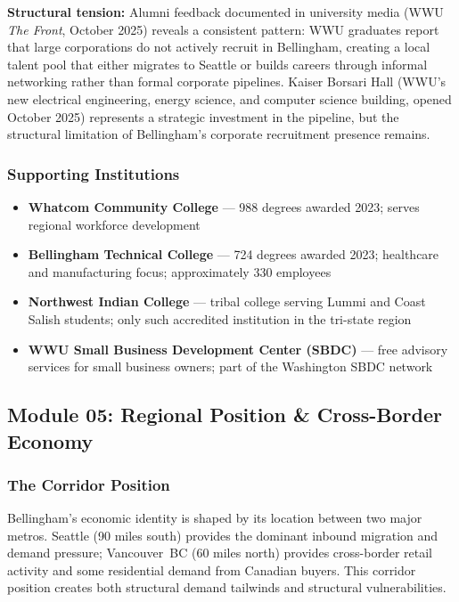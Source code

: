\documentclass[11pt,letterpaper]{article}
\begin{document}
\textbf{Structural tension:} Alumni feedback documented in university media (WWU \emph{The Front}, October 2025) reveals a consistent pattern: WWU graduates report that large corporations do not actively recruit in Bellingham, creating a local talent pool that either migrates to Seattle or builds careers through informal networking rather than formal corporate pipelines. Kaiser Borsari Hall (WWU's new electrical engineering, energy science, and computer science building, opened October 2025) represents a strategic investment in the pipeline, but the structural limitation of Bellingham's corporate recruitment presence remains.

\subsubsection{Supporting Institutions}

\begin{itemize}[leftmargin=*]
  \item \textbf{Whatcom Community College} --- 988 degrees awarded 2023; serves regional workforce development
  \item \textbf{Bellingham Technical College} --- 724 degrees awarded 2023; healthcare and manufacturing focus; approximately 330 employees
  \item \textbf{Northwest Indian College} --- tribal college serving Lummi and Coast Salish students; only such accredited institution in the tri-state region
  \item \textbf{WWU Small Business Development Center (SBDC)} --- free advisory services for small business owners; part of the Washington SBDC network
\end{itemize}

\subsection{Module 05: Regional Position \& Cross-Border Economy}

\subsubsection{The Corridor Position}

Bellingham's economic identity is shaped by its location between two major metros. Seattle (90 miles south) provides the dominant inbound migration and demand pressure; Vancouver~BC (60 miles north) provides cross-border retail activity and some residential demand from Canadian buyers. This corridor position creates both structural demand tailwinds and structural vulnerabilities.
\end{document}
